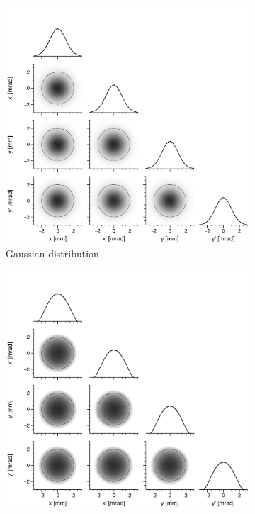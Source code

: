 \begin{figure}[!p]
    \begin{subfigure}{0.49\textwidth}
        \includegraphics[width=\textwidth]{Images/chapter1/Gaussian_dist.png}
        \caption{Gaussian distribution}
        \label{fig:distributions_gaussian}
    \end{subfigure}
    \hfill
    \begin{subfigure}{0.49\textwidth}
        \includegraphics[width=\textwidth]{Images/chapter1/Waterbag_dist.png}

\end{subfigure}
\end{figure}
